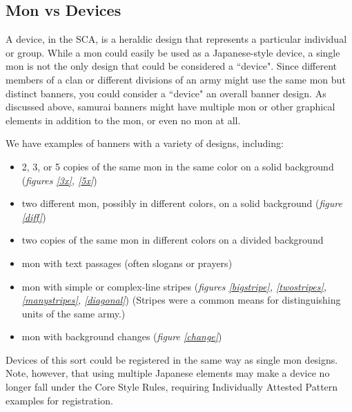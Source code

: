 \documentclass{article}
\begin{document}
\subsection{Mon vs Devices}

  A device, in the SCA, is a heraldic design that represents a
  particular individual or group.  While a mon could easily be used as
  a Japanese-style device, a single mon is not the only design that
  could be considered a ``device".  Since different members of a clan
  or different divisions of an army might use the same mon but
  distinct banners, you could consider a ``device" an overall banner
  design.  As discussed above, samurai banners might have multiple mon
  or other graphical elements in addition to the mon, or even no mon
  at all.

  We have examples of banners with a variety of designs, including:
  
\begin{itemize}
\item 2, 3, or 5
  copies of the same mon in the same color on a solid background
  (\emph{figures \ref{3x}, \ref{5x}})
\item two different mon, possibly in
  different colors, on a solid background (\emph{figure \ref{diff}})
\item two copies of the same mon in different colors on a divided
  background
\item mon with text passages (often slogans or prayers)
\item mon with simple or complex-line stripes (\emph{figures \ref{bigstripe}, \ref{twostripes},
  \ref{manystripes}, \ref{diagonal}}) (Stripes
  were a common means for distinguishing units of the same
  army.)
\item mon with background changes (\emph{figure \ref{change}})
\end{itemize}

  Devices of this sort could be registered in the same way as single
  mon designs.  Note, however, that using multiple Japanese elements
  may make a device no longer fall under the Core Style Rules,
  requiring Individually Attested Pattern examples for registration.

  \begin{figure}
  \begin{subfigs}
  \end{subfigs}
  \end{figure}
\end{document}
